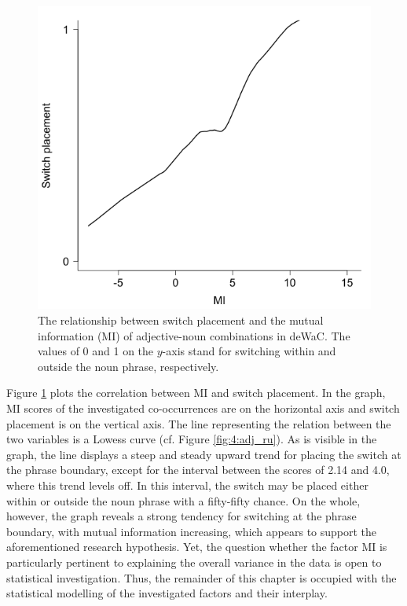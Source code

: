 \begin{figure}
    \includegraphics[scale=0.5]{figures/4-MI_de.png}
	\caption{The relationship between switch placement and the mutual information (MI) of adjective-noun combinations in deWaC. The values of 0 and 1 on the $y$-axis stand for switching within and outside the noun phrase, respectively.}
	\label{fig:4:MI_de}
\end{figure}

Figure \ref{fig:4:MI_de} plots the correlation between MI and switch placement. In the graph, MI scores of the investigated co-occurrences are on the horizontal axis and switch placement is on the vertical axis. The line representing the relation between the two variables is a Lowess curve (cf. Figure \ref{fig:4:adj_ru}). As is visible in the graph, the line displays a steep and steady upward trend for placing the switch at the phrase boundary, except for the interval between the scores of 2.14 and 4.0, where this trend levels off. In this interval, the switch may be placed either within or outside the noun phrase with a fifty-fifty chance. On the whole, however, the graph reveals a strong tendency for switching at the phrase boundary, with mutual information increasing, which appears to support the aforementioned research hypothesis. Yet, the question whether the factor MI is particularly pertinent to explaining the overall variance in the data is open to statistical investigation. Thus, the remainder of this chapter is occupied with the statistical modelling of the investigated factors and their interplay.

